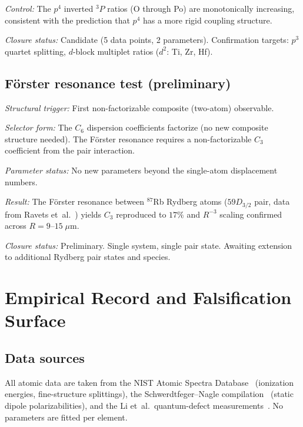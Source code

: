 \documentclass[11pt,a4paper]{article}
\begin{document}
\emph{Control:} The $p^4$ inverted ${}^3P$ ratios (O through Po) are monotonically increasing, consistent with the prediction that $p^4$ has a more rigid coupling structure.

\emph{Closure status:} Candidate (5 data points, 2 parameters). Confirmation targets: $p^3$ quartet splitting, $d$-block multiplet ratios ($d^2$: Ti, Zr, Hf).

\subsection{F\"orster resonance test (preliminary)}
\label{sec:forster}

\emph{Structural trigger:} First non-factorizable composite (two-atom) observable.

\emph{Selector form:} The $C_6$ dispersion coefficients factorize (no new composite structure needed). The F\"orster resonance requires a non-factorizable $C_3$ coefficient from the pair interaction.

\emph{Parameter status:} No new parameters beyond the single-atom displacement numbers.

\emph{Result:} The F\"orster resonance between ${}^{87}$Rb Rydberg atoms ($59D_{3/2}$ pair, data from Ravets et~al.~\cite{Ravets2014}) yields $C_3$ reproduced to $17\%$ and $R^{-3}$ scaling confirmed across $R = 9$--$15\;\mu$m.

\emph{Closure status:} Preliminary. Single system, single pair state. Awaiting extension to additional Rydberg pair states and species.

\section{Empirical Record and Falsification Surface}
\label{sec:empirical}

\subsection{Data sources}

All atomic data are taken from the NIST Atomic Spectra Database~\cite{NIST_ASD} (ionization energies, fine-structure splittings), the Schwerdtfeger--Nagle compilation~\cite{Schwerdtfeger2019} (static dipole polarizabilities), and the Li et~al.\ quantum-defect measurements~\cite{Li2003}. No parameters are fitted per element.
\end{document}
